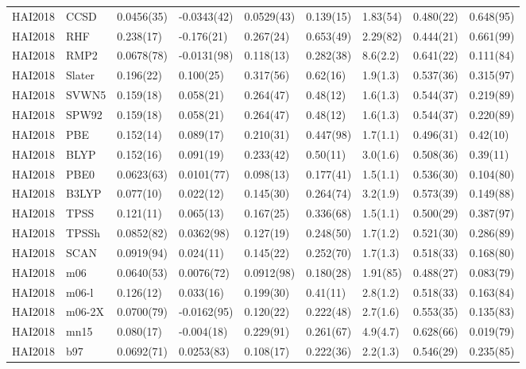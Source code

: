 \begin{table}[ht]
\begin{tabular}{lllllllll}
  HAI2018 & CCSD & 0.0456(35) & -0.0343(42) & 0.0529(43) & 0.139(15) & 1.83(54) & 0.480(22) & 0.648(95) \\ 
  HAI2018 & RHF & 0.238(17) & -0.176(21) & 0.267(24) & 0.653(49) & 2.29(82) & 0.444(21) & 0.661(99) \\ 
  HAI2018 & RMP2 & 0.0678(78) & -0.0131(98) & 0.118(13) & 0.282(38) & 8.6(2.2) & 0.641(22) & 0.111(84) \\ 
  HAI2018 & Slater & 0.196(22) & 0.100(25) & 0.317(56) & 0.62(16) & 1.9(1.3) & 0.537(36) & 0.315(97) \\ 
  HAI2018 & SVWN5 & 0.159(18) & 0.058(21) & 0.264(47) & 0.48(12) & 1.6(1.3) & 0.544(37) & 0.219(89) \\ 
  HAI2018 & SPW92 & 0.159(18) & 0.058(21) & 0.264(47) & 0.48(12) & 1.6(1.3) & 0.544(37) & 0.220(89) \\ 
  HAI2018 & PBE & 0.152(14) & 0.089(17) & 0.210(31) & 0.447(98) & 1.7(1.1) & 0.496(31) & 0.42(10) \\ 
  HAI2018 & BLYP & 0.152(16) & 0.091(19) & 0.233(42) & 0.50(11) & 3.0(1.6) & 0.508(36) & 0.39(11) \\ 
  HAI2018 & PBE0 & 0.0623(63) & 0.0101(77) & 0.098(13) & 0.177(41) & 1.5(1.1) & 0.536(30) & 0.104(80) \\ 
  HAI2018 & B3LYP & 0.077(10) & 0.022(12) & 0.145(30) & 0.264(74) & 3.2(1.9) & 0.573(39) & 0.149(88) \\ 
  HAI2018 & TPSS & 0.121(11) & 0.065(13) & 0.167(25) & 0.336(68) & 1.5(1.1) & 0.500(29) & 0.387(97) \\ 
  HAI2018 & TPSSh & 0.0852(82) & 0.0362(98) & 0.127(19) & 0.248(50) & 1.7(1.2) & 0.521(30) & 0.286(89) \\ 
  HAI2018 & SCAN & 0.0919(94) & 0.024(11) & 0.145(22) & 0.252(70) & 1.7(1.3) & 0.518(33) & 0.168(80) \\ 
  HAI2018 & m06 & 0.0640(53) & 0.0076(72) & 0.0912(98) & 0.180(28) & 1.91(85) & 0.488(27) & 0.083(79) \\ 
  HAI2018 & m06-l & 0.126(12) & 0.033(16) & 0.199(30) & 0.41(11) & 2.8(1.2) & 0.518(33) & 0.163(84) \\ 
  HAI2018 & m06-2X & 0.0700(79) & -0.0162(95) & 0.120(22) & 0.222(48) & 2.7(1.6) & 0.553(35) & 0.135(83) \\ 
  HAI2018 & mn15 & 0.080(17) & -0.004(18) & 0.229(91) & 0.261(67) & 4.9(4.7) & 0.628(66) & 0.019(79) \\ 
  HAI2018 & b97 & 0.0692(71) & 0.0253(83) & 0.108(17) & 0.222(36) & 2.2(1.3) & 0.546(29) & 0.235(85) \\ 

\end{tabular}
\end{table}
